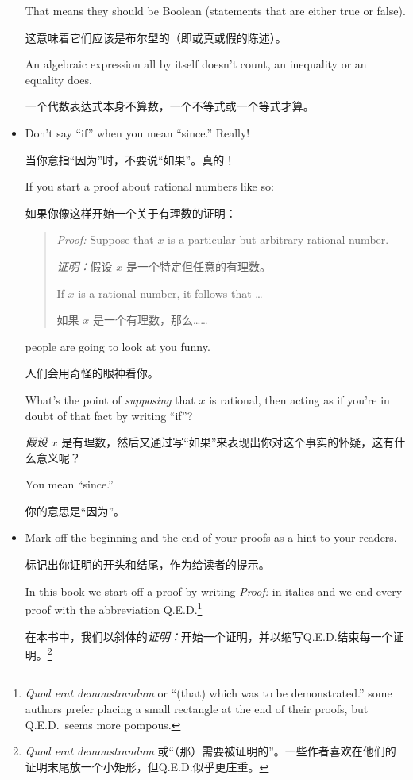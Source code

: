 \begin{itemize}
            That means they should be Boolean (statements that are either true or false).

            这意味着它们应该是布尔型的（即或真或假的陈述）。

            An algebraic expression all by itself doesn't count, an inequality or an
            equality does.

            一个代数表达式本身不算数，一个不等式或一个等式才算。
      \item Don't say ``if'' when you mean ``since.''  Really!

            当你意指“因为”时，不要说“如果”。真的！

            If you start a
            proof about rational numbers like so:

            如果你像这样开始一个关于有理数的证明：

            \begin{quote}
                  {\em Proof:} Suppose that $x$ is a particular but arbitrary rational number.

                        {\em 证明：}假设 $x$ 是一个特定但任意的有理数。

                  If $x$ is a rational number, it follows that \ldots

                  如果 $x$ 是一个有理数，那么……
            \end{quote}

            \noindent people are going to look at you funny.

            \noindent 人们会用奇怪的眼神看你。

            What's the point of
                  {\em supposing}
            that $x$ is rational, then acting as if you're in doubt of that fact by
            writing ``if''?

            {\em 假设} $x$ 是有理数，然后又通过写“如果”来表现出你对这个事实的怀疑，这有什么意义呢？

            You mean ``since.''

            你的意思是“因为”。
      \item Mark off the beginning and the end of your proofs as a hint to your
            readers.

            标记出你证明的开头和结尾，作为给读者的提示。

            In this book we start off a proof by writing {\em Proof:} in
            italics and we end every proof with the abbreviation
            Q.E.D.\footnote{{\em Quod erat demonstrandum} or ``(that) which was to
                  be demonstrated.'' some authors prefer placing a small rectangle at
                  the end of their proofs, but Q.E.D.\ seems more pompous. }

            在本书中，我们以斜体的{\em 证明：}开始一个证明，并以缩写Q.E.D.结束每一个证明。\footnote{{\em Quod erat demonstrandum} 或“（那）需要被证明的”。一些作者喜欢在他们的证明末尾放一个小矩形，但Q.E.D.似乎更庄重。}
\end{itemize}

